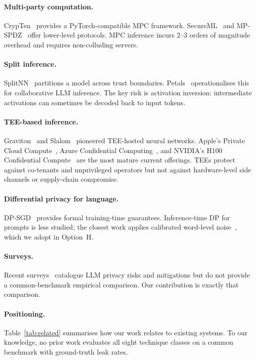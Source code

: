 \documentclass[11pt,a4paper]{article}
\begin{document}
\paragraph{Multi-party computation.}
CrypTen~\cite{crypten} provides a PyTorch-compatible MPC
framework.  SecureML~\cite{secureml} and
MP-SPDZ~\cite{mpspdz} offer lower-level protocols.  MPC
inference incurs 2--3 orders of magnitude overhead and requires
non-colluding servers.

\paragraph{Split inference.}
SplitNN~\cite{splitnn} partitions a model across trust
boundaries.  Petals~\cite{petals} operationalises this for
collaborative LLM inference.  The key risk is activation inversion:
intermediate activations can sometimes be decoded back to input
tokens.

\paragraph{TEE-based inference.}
Graviton~\cite{graviton} and Slalom~\cite{slalom}
pioneered TEE-hosted neural networks.  Apple's Private Cloud
Compute~\cite{apple-pcc}, Azure Confidential
Computing~\cite{azure-cc}, and NVIDIA's H100 Confidential
Compute~\cite{h100cc} are the most mature current offerings.
TEEs protect against co-tenants and unprivileged operators but not
against hardware-level side channels or supply-chain compromise.

\paragraph{Differential privacy for language.}
DP-SGD~\cite{dpsgd} provides formal training-time guarantees.
Inference-time DP for prompts is less studied; the closest work
applies calibrated word-level noise~\cite{dp-prompt}, which
we adopt in Option~H.

\paragraph{Surveys.}
Recent surveys~\cite{survey-yao,survey-das} catalogue LLM
privacy risks and mitigations but do not provide a common-benchmark
empirical comparison.  Our contribution is exactly that comparison.

\paragraph{Positioning.}
Table~\ref{tab:related} summarises how our work relates to
existing systems.  To our knowledge, no prior work evaluates
all eight technique classes on a common benchmark with
ground-truth leak rates.
\end{document}
